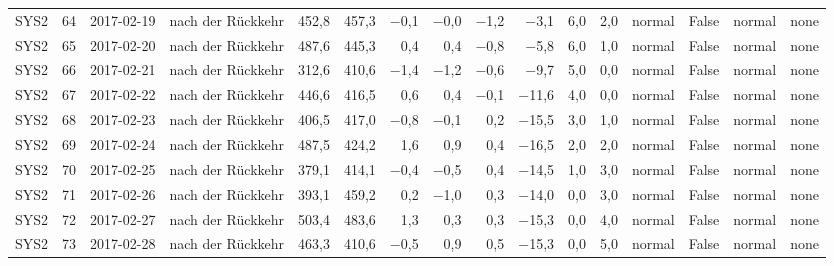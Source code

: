 \begin{tabular}{lrllrrrrrrrrlrll}
SYS2 & 64 & 2017-02-19 & nach der Rückkehr & 452,8 & 457,3 & $-$0,1 & $-$0,0 & $-$1,2 & $-$3,1 & 6,0 & 2,0 & normal & False & normal & none \\
SYS2 & 65 & 2017-02-20 & nach der Rückkehr & 487,6 & 445,3 & 0,4 & 0,4 & $-$0,8 & $-$5,8 & 6,0 & 1,0 & normal & False & normal & none \\
SYS2 & 66 & 2017-02-21 & nach der Rückkehr & 312,6 & 410,6 & $-$1,4 & $-$1,2 & $-$0,6 & $-$9,7 & 5,0 & 0,0 & normal & False & normal & none \\
SYS2 & 67 & 2017-02-22 & nach der Rückkehr & 446,6 & 416,5 & 0,6 & 0,4 & $-$0,1 & $-$11,6 & 4,0 & 0,0 & normal & False & normal & none \\
SYS2 & 68 & 2017-02-23 & nach der Rückkehr & 406,5 & 417,0 & $-$0,8 & $-$0,1 & 0,2 & $-$15,5 & 3,0 & 1,0 & normal & False & normal & none \\
SYS2 & 69 & 2017-02-24 & nach der Rückkehr & 487,5 & 424,2 & 1,6 & 0,9 & 0,4 & $-$16,5 & 2,0 & 2,0 & normal & False & normal & none \\
SYS2 & 70 & 2017-02-25 & nach der Rückkehr & 379,1 & 414,1 & $-$0,4 & $-$0,5 & 0,4 & $-$14,5 & 1,0 & 3,0 & normal & False & normal & none \\
SYS2 & 71 & 2017-02-26 & nach der Rückkehr & 393,1 & 459,2 & 0,2 & $-$1,0 & 0,3 & $-$14,0 & 0,0 & 3,0 & normal & False & normal & none \\
SYS2 & 72 & 2017-02-27 & nach der Rückkehr & 503,4 & 483,6 & 1,3 & 0,3 & 0,3 & $-$15,3 & 0,0 & 4,0 & normal & False & normal & none \\
SYS2 & 73 & 2017-02-28 & nach der Rückkehr & 463,3 & 410,6 & $-$0,5 & 0,9 & 0,5 & $-$15,3 & 0,0 & 5,0 & normal & False & normal & none \\
\bottomrule
\end{tabular}
